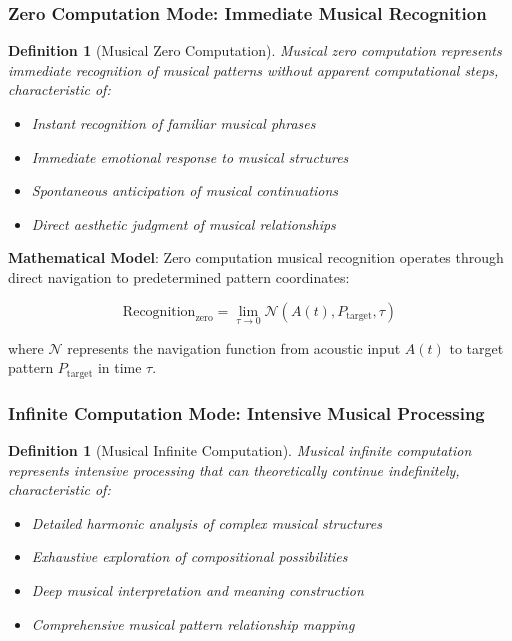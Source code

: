 \documentclass[12pt,a4paper]{article}
\newtheorem{definition}[theorem]{Definition}
\begin{document}
\subsubsection{Zero Computation Mode: Immediate Musical Recognition}

\begin{definition}[Musical Zero Computation]
Musical zero computation represents immediate recognition of musical patterns without apparent computational steps, characteristic of:
\begin{itemize}
\item Instant recognition of familiar musical phrases
\item Immediate emotional response to musical structures
\item Spontaneous anticipation of musical continuations
\item Direct aesthetic judgment of musical relationships
\end{itemize}
\end{definition}

\textbf{Mathematical Model}:
Zero computation musical recognition operates through direct navigation to predetermined pattern coordinates:

$$\text{Recognition}_{\text{zero}} = \lim_{\tau \to 0} \mathcal{N}(A(t), P_{\text{target}}, \tau)$$

where $\mathcal{N}$ represents the navigation function from acoustic input $A(t)$ to target pattern $P_{\text{target}}$ in time $\tau$.

\subsubsection{Infinite Computation Mode: Intensive Musical Processing}

\begin{definition}[Musical Infinite Computation]
Musical infinite computation represents intensive processing that can theoretically continue indefinitely, characteristic of:
\begin{itemize}
\item Detailed harmonic analysis of complex musical structures
\item Exhaustive exploration of compositional possibilities
\item Deep musical interpretation and meaning construction
\item Comprehensive musical pattern relationship mapping
\end{itemize}
\end{definition}
\end{document}
